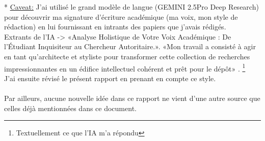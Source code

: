 * \underline{Caveat:} J'ai utilisé le grand modèle de langue (GEMINI 2.5Pro Deep Research) pour découvrir ma signature d'écriture académique (ma voix, mon style de rédaction) en lui fournissant en intrants des papiers que j'avais rédigés. \\
Extrants de l'IA ->  «Analyse Holistique de Votre Voix Académique : De l'Étudiant Inquisiteur au Chercheur Autoritaire.». «Mon travail a consisté à agir en tant qu'architecte et styliste pour transformer cette collection de recherches impressionnantes en un édifice intellectuel cohérent et prêt pour le dépôt» .  \footnote{Textuellement ce que l'IA m'a répondu} \\
J'ai ensuite révisé le présent rapport en prenant en compte ce style. \\
\\
Par ailleurs, aucune nouvelle idée dans ce rapport ne vient d'une autre source que celles déjà mentionnées dans ce document.
